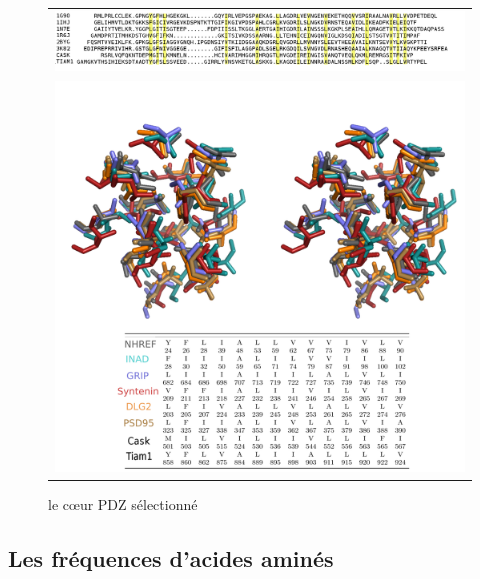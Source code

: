     
    \clearpage

   \begin{figure}[t]
     \centering
     \begin{tabular}{c}
       \includegraphics[width=18cm]{images/natives_alignees.png} \\
       \includegraphics[width=16cm]{images/corePDZ2.png} \\
     \end{tabular}
     \caption{le cœur PDZ sélectionné}
   \end{figure}
    \begin{table}[!htbp]
      \centering

       \label{tab:corePDZ}      
    \end{table}

\subsection{Les fréquences d'acides aminés}

